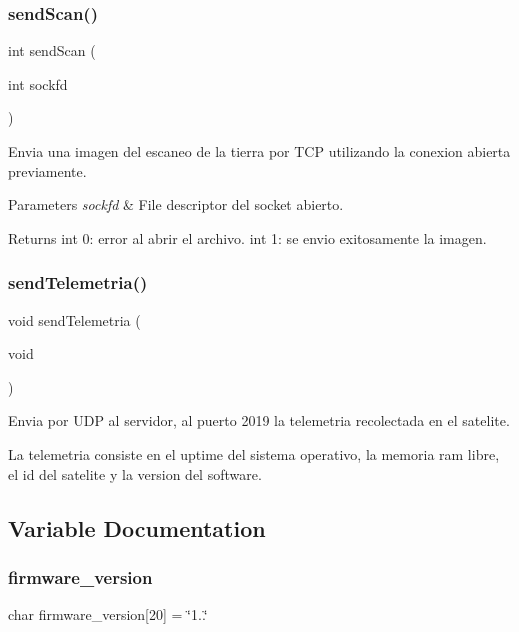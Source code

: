 \subsubsection{sendScan()}
{\footnotesize\ttfamily int send\+Scan (\begin{DoxyParamCaption}\item[{int}]{sockfd }\end{DoxyParamCaption})}



Envia una imagen del escaneo de la tierra por T\+CP utilizando la conexion abierta previamente. 


\begin{DoxyParams}{Parameters}
{\em sockfd} & File descriptor del socket abierto. \\
\hline
\end{DoxyParams}
\begin{DoxyReturn}{Returns}
int 0\+: error al abrir el archivo. int 1\+: se envio exitosamente la imagen. 
\end{DoxyReturn}
\mbox{\label{client_2main_8c_afb71bcd753e06f6a116706d762ab8f79}} 
\subsubsection{sendTelemetria()}
{\footnotesize\ttfamily void send\+Telemetria (\begin{DoxyParamCaption}\item[{void}]{ }\end{DoxyParamCaption})}



Envia por U\+DP al servidor, al puerto 2019 la telemetria recolectada en el satelite. 

La telemetria consiste en el uptime del sistema operativo, la memoria ram libre, el id del satelite y la version del software. 

\subsection{Variable Documentation}
\mbox{\label{client_2main_8c_acc4ef5efef44f2ed8aff7cf818e27f47}} 
\subsubsection{firmware\_version}
{\footnotesize\ttfamily char firmware\+\_\+version[20] = \char`\"{}1..\char`\"{}}

